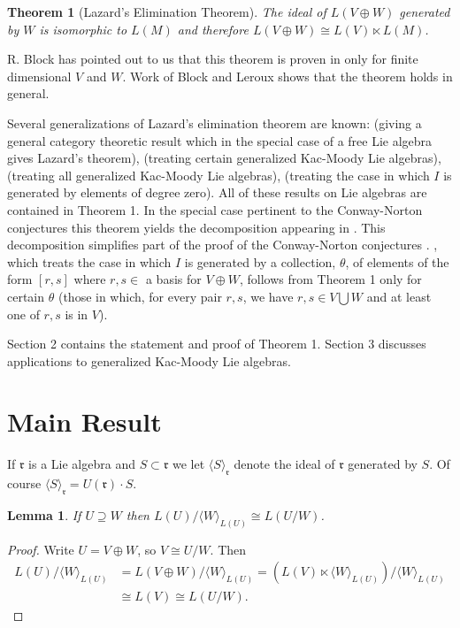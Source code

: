 \documentclass[11pt]{amsart}
\newtheorem{theorem}{Theorem}%
\newtheorem{lemma}{Lemma}
\theoremstyle{definition}
\newcommand\la{\langle}
\newcommand\ra{\rangle}
\renewcommand{\frak}{\mathfrak}
\begin{document}
\begin{theorem}[Lazard's Elimination Theorem]
The ideal of $L(V \oplus W) $ generated by $W$ is isomorphic to $L(M)$
and therefore $L(V \oplus W) \cong L(V) \ltimes L(M)$. \end{theorem}

R. Block has pointed out to us that this theorem is proven in
\cite{4} only for finite dimensional $V$ and $W$.
Work of Block and Leroux \cite{1} shows that the theorem holds in general. 

Several generalizations of Lazard's elimination theorem
 are known: \cite{1} (giving a
general category theoretic result which in the special case of a free
Lie algebra gives Lazard's theorem),  \cite{6} (treating certain 
generalized Kac-Moody Lie algebras), \cite{7}
(treating all generalized Kac-Moody Lie algebras), \cite{11} (treating the
case in which $I$ is generated by elements of degree zero).  All of
these results on Lie algebras are contained in Theorem 1. In the
special case pertinent to the Conway-Norton conjectures this theorem
yields the decomposition appearing in \cite{6}. This decomposition
simplifies part of the proof of the Conway-Norton 
conjectures \cite{6, 9}. \cite{5}, which treats the case in
which $I$ is generated by a collection, $\theta$, of elements of the 
form $[r,s]$ where $r,s \in$ a basis for $V \oplus W$, follows from Theorem 1 
only for certain $\theta$ (those in which, for 
every pair $r,s$, we have $r,s \in V \bigcup W$ and at least one of $r,s$ is in $V$).

Section 2 contains the statement and proof of Theorem 1.  Section 3
discusses applications to generalized Kac-Moody Lie algebras.

\section{Main Result}

If $\frak r$ is a Lie algebra and $ S \subset \frak r$ we let 
$\la  S \ra_\frak r$ denote
the ideal of $\frak r$ generated by $S$. Of course 
$\la  S \ra_\frak r = U(\frak r) \cdot S$.

\begin{lemma} 
If $U \supseteq W$ then $L(U)/{\la W \ra}_{L(U)} \cong L(U /W)$.
\end{lemma}

\begin{proof}
Write $U= V \oplus W$, so $V \cong U /W$. Then 
\begin{align*}
L(U)/ \la W \ra_{L(U)} & =  L(V \oplus W)/\la W \ra_{L(U)} = (L(V) \ltimes \la W
\ra_{L(U)})/\la W \ra_{L(U)} \\
&\cong L(V) \cong L(U/W).
\end{align*}
\end{proof}
\end{document}

